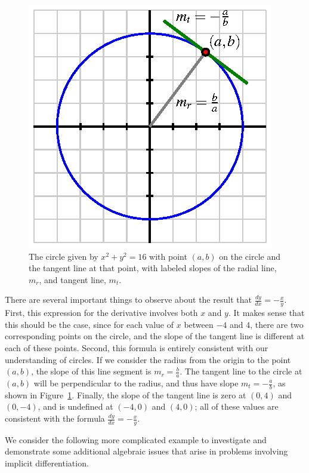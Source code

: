\begin{figure}[h]
\begin{center}
\includegraphics{figures/2_7_Circle.eps}
\caption{The circle given by $x^2 + y^2 = 16$ with point $(a,b)$ on the circle and the tangent line at that point, with labeled slopes of the radial line, $m_r$, and tangent line, $m_t$.} \label{F:2.7.Circle}
\end{center}
\end{figure}

There are several important things to observe about the result that $\frac{dy}{dx} = -\frac{x}{y}$.  First, this expression for the derivative involves both $x$ and $y$.  It makes sense that this should be the case, since for each value of $x$ between $-4$ and $4$, there are two corresponding points on the circle, and the slope of the tangent line is different at each of these points.  Second, this formula is entirely consistent with our understanding of circles.  If we consider the radius from the origin to the point $(a,b)$, the slope of this line segment is $m_r = \frac{b}{a}$.  The tangent line to the circle at $(a,b)$ will be perpendicular to the radius, and thus have slope $m_t = -\frac{a}{b}$, as shown in Figure~\ref{F:2.7.Circle}.  Finally, the slope of the tangent line is zero at $(0,4)$ and $(0,-4)$, and is undefined at $(-4,0)$ and $(4,0)$; all of these values are consistent with the formula $\frac{dy}{dx} = -\frac{x}{y}$.

We consider the following more complicated example to investigate and demonstrate some additional algebraic issues that arise in problems involving implicit differentiation.

